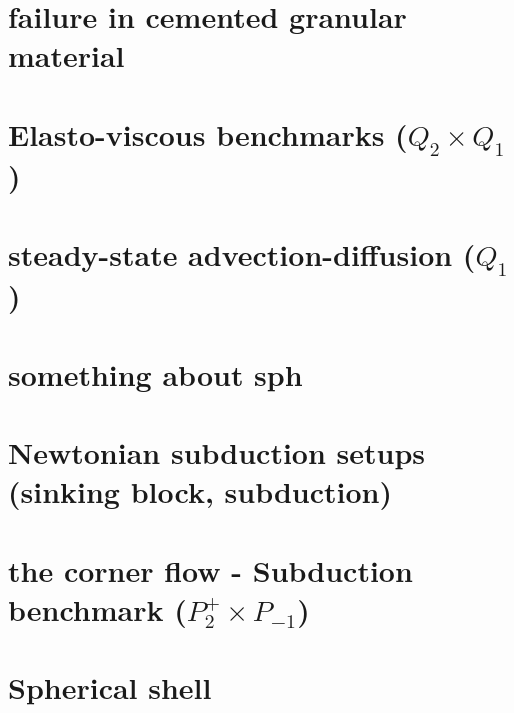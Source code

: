 \documentclass[a4paper,11pt]{report}
\begin{document}
\chapter{failure in cemented granular material \label{f63}} %

\chapter{Elasto-viscous benchmarks ($Q_2\times Q_1$)\label{f64}} %

\chapter{steady-state advection-diffusion ($Q_1$) \label{f65}} %

\chapter{something about sph \label{f66}} %

\chapter{Newtonian subduction setups (sinking block, subduction)\label{f67}} %

\chapter{the corner flow - Subduction benchmark ($P_2^+\times P_{-1}$)  \label{f68}} %

\chapter{Spherical shell \label{f69}} %
\end{document}
